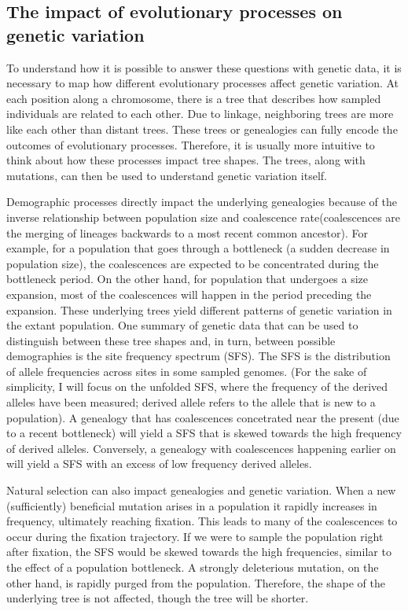 \subsection{The impact of evolutionary processes on genetic variation}
To understand how it is possible to answer these questions with genetic data,
it is necessary to map how different evolutionary processes affect genetic variation.
At each position along a chromosome, there is a tree that describes how sampled individuals are related to each other.
Due to linkage, neighboring trees are more like each other than distant trees.
These trees or genealogies can fully encode the outcomes of evolutionary processes.
Therefore, it is usually more intuitive to think about how these processes impact tree shapes.
The trees, along with mutations, can then be used to understand genetic variation itself.

Demographic processes directly impact the underlying genealogies because of the inverse relationship between population size and coalescence rate(coalescences are the merging of lineages backwards to a most recent common ancestor).
For example, for a population that goes through a bottleneck (\ie a sudden decrease in population size),
the coalescences are expected to be concentrated during the bottleneck period.
On the other hand, for population that undergoes a size expansion,
most of the coalescences will happen in the period preceding the expansion.
These underlying trees yield different patterns of genetic variation in the extant population.
One summary of genetic data that can be used to distinguish between these tree shapes and, in turn, between possible demographies is the site frequency spectrum (SFS).
The SFS is the distribution of allele frequencies across sites in some sampled genomes.
(For the sake of simplicity, I will focus on the unfolded SFS, where the frequency of the derived alleles have been measured; derived allele refers to the allele that is new to a population).
A genealogy that has coalescences concetrated near the present (due to a recent bottleneck) will yield a SFS that is skewed towards the high frequency of derived alleles.
Conversely, a genealogy with coalescences happening earlier on will yield a SFS with an excess of low frequency derived alleles.

Natural selection can also impact genealogies and genetic variation.
When a new (sufficiently) beneficial mutation arises in a population it rapidly increases in frequency, ultimately reaching fixation.
This leads to many of the coalescences to occur during the fixation trajectory.
If we were to sample the population right after fixation,
the SFS would be skewed towards the high frequencies, similar to the effect of a population bottleneck.
A strongly deleterious mutation, on the other hand, is rapidly purged from the population.
Therefore, the shape of the underlying tree is not affected, though the tree will be shorter.

